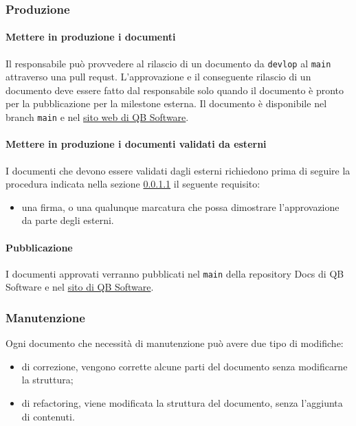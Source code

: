     \subsubsection{Produzione} 
        \paragraph{Mettere in produzione i documenti} \label{sec:doc_production}
            Il responsabile può provvedere al rilascio di un documento da \verb|devlop| al \verb|main| attraverso una pull requst. L'approvazione e il conseguente rilascio di un documento deve essere fatto dal responsabile solo quando il documento è pronto per la pubblicazione per la milestone esterna. Il documento è disponibile nel branch \verb|main| e nel \href{https://qb-software-swe.github.io/docs/}{sito web di QB Software}.
            
        \paragraph{Mettere in produzione i documenti validati da esterni} \label{sec:doc_approval_external}
        	I documenti che devono essere validati dagli esterni richiedono prima di seguire la procedura indicata nella sezione \ref{sec:doc_production} il seguente requisito:
        	\begin{itemize}
        		\item una firma, o una qualunque marcatura che possa dimostrare l'approvazione da parte degli esterni.
        	\end{itemize}

		\paragraph{Pubblicazione}
			I documenti approvati verranno pubblicati nel \verb|main| della repository Docs di QB Software e nel \href{https://qb-software-swe.github.io/docs/site/index.html}{sito di QB Software}.

    \subsubsection{Manutenzione} \label{sec:doc_maintenance}
        Ogni documento che necessità di manutenzione può avere due tipo di modifiche:
        \begin{itemize}
            \item di correzione, vengono corrette alcune parti del documento senza modificarne la struttura;
            \item di refactoring, viene modificata la struttura del documento, senza l'aggiunta di contenuti.
        \end{itemize}